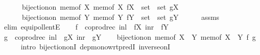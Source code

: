\begin{isabellebody}
\ \ \ \ \ \ {\isachardoublequoteopen}bijection{\isacharunderscore}{\kern0pt}on\ {\isacharparenleft}{\kern0pt}mem{\isacharunderscore}{\kern0pt}of\ X{\isacharparenright}{\kern0pt}\ {\isacharparenleft}{\kern0pt}mem{\isacharunderscore}{\kern0pt}of\ X{\isacharprime}{\kern0pt}{\isacharparenright}{\kern0pt}\ {\isacharparenleft}{\kern0pt}fX\ {\isacharcolon}{\kern0pt}{\isacharcolon}{\kern0pt}\ set\ {\isasymRightarrow}\ set{\isacharparenright}{\kern0pt}\ gX{\isachardoublequoteclose}\isanewline
\ \ \ \ \ \ {\isachardoublequoteopen}bijection{\isacharunderscore}{\kern0pt}on\ {\isacharparenleft}{\kern0pt}mem{\isacharunderscore}{\kern0pt}of\ Y{\isacharparenright}{\kern0pt}\ {\isacharparenleft}{\kern0pt}mem{\isacharunderscore}{\kern0pt}of\ Y{\isacharprime}{\kern0pt}{\isacharparenright}{\kern0pt}\ {\isacharparenleft}{\kern0pt}fY\ {\isacharcolon}{\kern0pt}{\isacharcolon}{\kern0pt}\ set\ {\isasymRightarrow}\ set{\isacharparenright}{\kern0pt}\ gY{\isachardoublequoteclose}\isanewline
\ \ \ \ \isamarkupfalse%
\ assms\ \isamarkupfalse%
\ {\isacharparenleft}{\kern0pt}elim\ equipollentE{\isacharparenright}{\kern0pt}\isanewline
\ \ \isamarkupfalse%
\ {\isacharquery}{\kern0pt}f\ {\isacharequal}{\kern0pt}\ {\isachardoublequoteopen}coprod{\isacharunderscore}{\kern0pt}rec\ {\isacharparenleft}{\kern0pt}inl\ {\isasymcirc}\ fX{\isacharparenright}{\kern0pt}\ {\isacharparenleft}{\kern0pt}inr\ {\isasymcirc}\ fY{\isacharparenright}{\kern0pt}{\isachardoublequoteclose}\isanewline
\ \ \isamarkupfalse%
\ {\isacharquery}{\kern0pt}g\ {\isacharequal}{\kern0pt}\ {\isachardoublequoteopen}coprod{\isacharunderscore}{\kern0pt}rec\ {\isacharparenleft}{\kern0pt}inl\ {\isasymcirc}\ gX{\isacharparenright}{\kern0pt}\ {\isacharparenleft}{\kern0pt}inr\ {\isasymcirc}\ gY{\isacharparenright}{\kern0pt}{\isachardoublequoteclose}\isanewline
\ \ \isamarkupfalse%
\ {\isachardoublequoteopen}bijection{\isacharunderscore}{\kern0pt}on\ {\isacharparenleft}{\kern0pt}mem{\isacharunderscore}{\kern0pt}of\ {\isacharparenleft}{\kern0pt}X\ {\isasymCoprod}\ Y{\isacharparenright}{\kern0pt}{\isacharparenright}{\kern0pt}\ {\isacharparenleft}{\kern0pt}mem{\isacharunderscore}{\kern0pt}of\ {\isacharparenleft}{\kern0pt}X{\isacharprime}{\kern0pt}\ {\isasymCoprod}\ Y{\isacharprime}{\kern0pt}{\isacharparenright}{\kern0pt}{\isacharparenright}{\kern0pt}\ {\isacharquery}{\kern0pt}f\ {\isacharquery}{\kern0pt}g{\isachardoublequoteclose}\isanewline
\ \ \ \ \isamarkupfalse%
\ {\isacharparenleft}{\kern0pt}intro\ bijection{\isacharunderscore}{\kern0pt}onI\ dep{\isacharunderscore}{\kern0pt}mono{\isacharunderscore}{\kern0pt}wrt{\isacharunderscore}{\kern0pt}predI\ inverse{\isacharunderscore}{\kern0pt}onI{\isacharparenright}{\kern0pt}\isanewline

\end{isabellebody}
